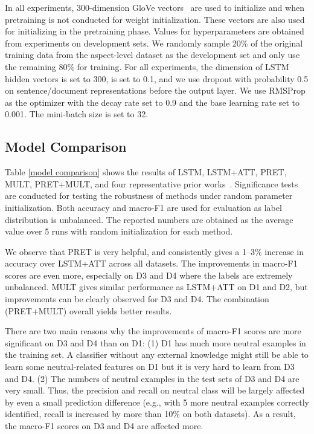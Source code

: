 \documentclass[11pt,a4paper]{article}
\begin{document}
In all experiments, 300-dimension GloVe vectors~\cite{Pennington:14} are used to initialize  and  when pretraining is not conducted for weight initialization. These vectors are also used for initializing  in the pretraining phase. Values for hyperparameters are obtained from experiments on development sets. We randomly sample 20\% of the original training data from the aspect-level dataset as the development set and only use the remaining 80\% for training. For all experiments, the dimension of LSTM hidden vectors is set to 300,  is set to 0.1, and we use dropout with probability 0.5 on sentence/document representations before the output layer. We use RMSProp as the optimizer with the decay rate set to 0.9 and the base learning rate set to 0.001. The mini-batch size is set to 32.

\subsection{Model Comparison}
Table \ref{model comparison} shows the results of LSTM, LSTM+ATT, PRET, MULT, PRET+MULT, and four representative prior works~\cite{Tang:16a,Tang:16b,Wang:16,Chen:17}.  Significance tests are conducted for testing the robustness of methods under random parameter initialization.
Both accuracy and macro-F1 are used for evaluation as label distribution is unbalanced. The reported numbers are obtained as the average value over 5 runs with random initialization for each method. 

We observe that PRET is very helpful, and consistently gives a 1--3\% increase in accuracy over LSTM+ATT across all datasets. The improvements in macro-F1 scores are even more, especially on D3 and D4 where the labels are extremely unbalanced. 
MULT gives similar performance as LSTM+ATT on D1 and D2, but improvements can be clearly observed for D3 and D4. The combination (PRET+MULT) overall yields better results.

There are two main reasons why the improvements of macro-F1 scores are more significant on D3 and D4 than on D1: (1) D1 has much more neutral examples in the training set. A classifier without any external knowledge might still be able to learn some neutral-related features on D1 but it is very hard to learn from D3 and D4. (2) The numbers of neutral examples in the test sets of D3 and D4 are very small. Thus, the precision and recall on neutral class will be largely affected by even a small prediction difference (e.g., with 5 more neutral examples correctly identified, recall is increased by more than 10\% on both datasets). As a result, the macro-F1 scores on D3 and D4 are affected more.
\end{document}
